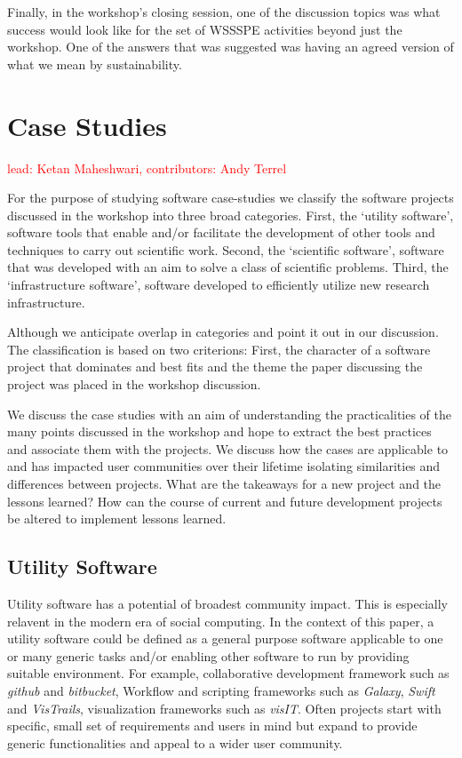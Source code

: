 \documentclass[11pt, oneside]{amsart}
\newcommand{\note}[1]{ {\textcolor{red}    { #1 }}}
\begin{document}
Finally, in the workshop's closing session, one of the discussion topics was
what success would look like for the set of WSSSPE activities beyond just the workshop.
One of the answers that was suggested was
having an agreed version of what we mean by sustainability.


\section{Case Studies} \label{sec:use-cases}
\note{lead: Ketan Maheshwari, contributors: Andy Terrel}

For the purpose of studying software case-studies we classify the software
projects discussed in the workshop into three broad categories. First, the
`utility software', software tools that enable and/or facilitate the
development of other tools and techniques to carry out scientific work. Second,
the `scientific software', software that was developed with an aim to solve a
class of scientific problems. Third, the `infrastructure software', software
developed to efficiently utilize new research infrastructure.

Although we anticipate overlap in categories and point it out in our
discussion. The classification is based on two criterions: First, the character
of a software project that dominates and best fits and the theme the paper
discussing the project was placed in the workshop discussion. 

We discuss the case studies with an aim of understanding the practicalities of
the many points discussed in the workshop and hope to extract the best
practices and associate them with the projects. We discuss how the cases are
applicable to and has impacted user communities over their lifetime isolating
similarities and differences between projects. What are the takeaways for a new
project and the lessons learned?  How can the course of current and
future development projects be altered to implement lessons learned. 

\subsection{Utility Software}
Utility software has a potential of broadest community impact. This is
especially relavent in the modern era of social computing. In the context of
this paper, a utility software could be defined as a general purpose software
applicable to one or many generic tasks and/or enabling other software to run
by providing suitable environment. For example, collaborative development
framework such as \emph{github} and \emph{bitbucket}, Workflow and scripting
frameworks such as \emph{Galaxy}, \emph{Swift} and \emph{VisTrails},
visualization frameworks such as \emph{visIT}. Often projects start with
specific, small set of requirements and users in mind but expand to provide
generic functionalities and appeal to a wider user community.
\end{document}
